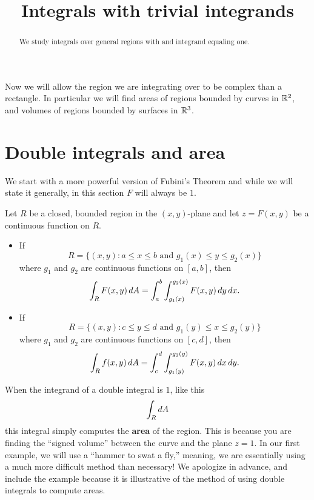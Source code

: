 \documentclass{ximera}
\title[Dig-In:]{Integrals with trivial integrands}
\begin{document}
\begin{abstract}
  We study integrals over general regions with and integrand equaling one.
\end{abstract}
\maketitle


Now we will allow the region we are integrating over to be complex
than a rectangle. In particular we will find areas of regions bounded
by curves in $\mathbb R^2$, and volumes of regions bounded by surfaces in
$\mathbb R^3$.

\section{Double integrals and area}

We start with a more powerful version of Fubini's
Theorem and while we will state it generally, in this section $F$ will
always be $1$.

\begin{theorem}
  Let $R$ be a closed, bounded region in the $(x,y)$-plane and let
  $z=F(x,y)$ be a continuous function on $R$.
  \begin{itemize}
  \item If
    \[
    R=\{(x,y):\text{$a\leq x\leq b$ and $g_1(x)\leq y\leq g_2(x)$}\}
    \]
    where $g_1$ and $g_2$ are continuous functions on $[a,b]$, then
    \[
    \int_R F(x,y) \mathop{}\!d A = \int_a^b\int_{g_1(x)}^{g_2(x)} F(x,y)\mathop{}\!d y\mathop{}\!d x.
    \]
  \item If
    \[
    R=\{(x,y):\text{$c\leq y\leq d$ and $g_1(y)\leq x\leq g_2(y)$}\}
    \]
    where $g_1$ and $g_2$ are continuous functions on $[c,d]$, then
    \[
    \int_R f(x,y)\mathop{}\!d A = \int_c^d\int_{g_1(y)}^{g_2(y)} F(x,y)\mathop{}\!d x\mathop{}\!d y.
    \]
\end{itemize}
\end{theorem}

When the integrand of a double integral is $1$, like this
\[
\int_R\mathop{}\!d A
\]
this integral simply computes the \textbf{area} of the region. This is
because you are finding the ``signed volume'' between the curve and
the plane $z=1$. In our first example, we will use a ``hammer to swat
a fly,'' meaning, we are essentially using a much more difficult
method than necessary! We apologize in advance, and include the
example because it is illustrative of the method of using double
integrals to compute areas.
\end{document}
